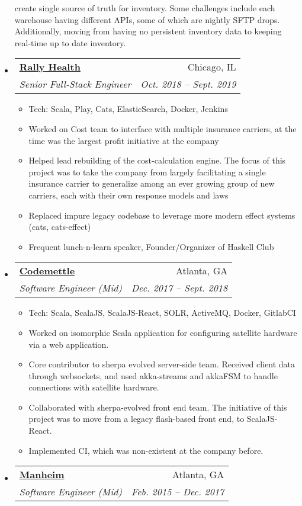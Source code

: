 \documentclass[letterpaper,11pt]{article}
\makeatletter
\newcommand{\resitem}[1]{\item #1 \vspace{-2pt}}
\newcommand{\ressubheading}[4]{
\begin{tabular*}{6.5in}{l@{\extracolsep{\fill}}r}
		\textbf{#1} & #2 \\
		\textit{#3} & \textit{#4} \\
\end{tabular*}\vspace{-6pt}}
\makeatother
\begin{document}
\begin{itemize}
{\begin{itemize}
{        create single source of truth for inventory. Some challenges include
        each warehouse having different APIs, some of which are nightly SFTP
        drops.  Additionally, moving from having no persistent inventory data
        to keeping real-time up to date inventory.}
    \end{itemize}
    }
\item
  \ressubheading{\href{http://www.rallyhealth.com/}{Rally Health}}{Chicago, IL}{Senior Full-Stack Engineer}{Oct. 2018 -- Sept. 2019}
    { \footnotesize
    \begin{itemize}
        \resitem{Tech: Scala, Play, Cats, ElasticSearch, Docker, Jenkins}
        \resitem{Worked on Cost team to interface with multiple insurance carriers, at the time was the largest profit initiative at the company}
        \resitem{Helped lead rebuilding of the cost-calculation engine. The focus of this project was to take the company from largely 
        facilitating a single insurance carrier to generalize among an ever growing group of new carriers, each with their own response models
        and laws}
        \resitem{Replaced impure legacy codebase to leverage more modern effect systems (cats, cats-effect)}
        \resitem{Frequent lunch-n-learn speaker, Founder/Organizer of Haskell Club}
    \end{itemize}
    }
\item
  \ressubheading{\href{http://www.codemettle.com/}{Codemettle}}{Atlanta, GA}{Software Engineer (Mid)}{Dec. 2017 -- Sept. 2018}
    { \footnotesize
    \begin{itemize}
        \resitem{Tech: Scala, ScalaJS, ScalaJS-React, SOLR, ActiveMQ, Docker, GitlabCI}
        \resitem{Worked on isomorphic Scala application for configuring satellite hardware via a web application.}
        \resitem{Core contributor to sherpa evolved server-side team. Received client data through websockets, and used akka-streams
        and akkaFSM to handle connections with satellite hardware.}
        \resitem{Collaborated with sherpa-evolved front end team. The initiative of this project was to move from a legacy flash-based front end,
        to ScalaJS-React.}
        \resitem{Implemented CI, which was non-existent at the company before.}
    \end{itemize}
    }
\item
  \ressubheading{\href{http://www.manheim.com/}{Manheim}}{Atlanta, GA}{Software Engineer (Mid)}{Feb. 2015 -- Dec. 2017}
    { \footnotesize
    \begin{itemize}

\end{itemize}}
\end{itemize}
\end{document}
